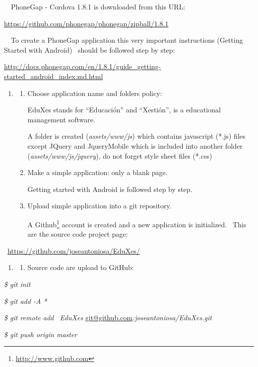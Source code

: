 \documentclass[a4paper]{article}
\begin{document}
\ \ PhoneGap - Cordova 1.8.1 is downloaded from this URL:

\url{https://github.com/phonegap/phonegap/zipball/1.8.1}\textit{ }

\ \ To create a PhoneGap application this very important instructions
(Getting Started with Android) \ should be followed step by step:

\url{http://docs.phonegap.com/en/1.8.1/guide_getting-started_android_index.md.html}\textit{
\ \ \ }


\bigskip

\begin{enumerate}
\item \begin{enumerate}
\item Choose application name and folder{\textquotesingle}s policy:

EduXes stands for “Educación” and “Xestión”, is a educational management
software.

A folder is created (\textit{assets/www/js}) which contains javascript
(*.js) files except JQuery and JqueryMobile which is included into
another folder (\textit{assets/www/js/jquery}), do not forget style
sheet files (*.css)
\item Make a simple application: only a blank page.

Getting started with Android is followed step by step.
\item Upload simple application into a git repository. 

A Github\footnote{\href{http://www.github.com/}{http://www.github.com} }
account is created and a new application is initialized. \ This are the
source code project page:
\end{enumerate}
\end{enumerate}
\textit{\ }\url{https://github.com/joseantoniosa/EduXes/}

\begin{enumerate}
\item \begin{enumerate}
\item[] Source code are upload to GitHub: 
\end{enumerate}
\end{enumerate}
{\itshape
\$ git init }

{\itshape
\$ git add -A *}

\textit{\$ git remote add \ EduXes
}\href{mailto:git@github.com}{git@github.com}\textit{:joseantoniosa/EduXes.git
}

{\itshape
\$ git push origin master}
\end{document}
